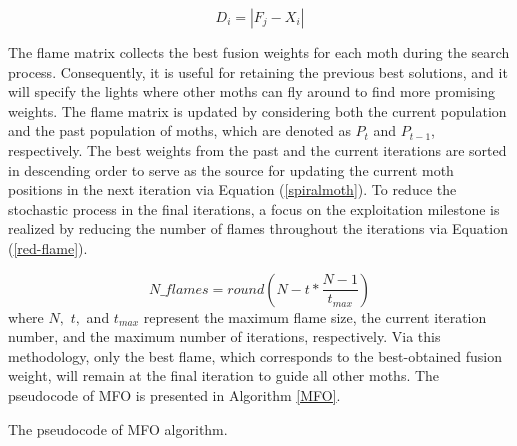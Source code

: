 \begin{equation}\label{distancemoth}
	{D_i}= |F_j - X_i|
\end{equation}


The flame matrix collects the best fusion weights for each moth during the search process. Consequently, it is useful for retaining the previous best solutions, and it will specify the lights where other moths can fly around to find more promising weights. The flame matrix is updated by considering both the current population and the past population of moths, which are denoted as $P_t$ and $P_{t-1}$, respectively. The best weights from the past and the current iterations are sorted in descending order to serve as the source for updating the current moth positions in the next iteration via Equation (\ref{spiralmoth}). To reduce the stochastic process in the final iterations, a focus on the exploitation milestone is realized by reducing the number of flames throughout the iterations via Equation (\ref{red-flame}).

\begin{equation}\label{red-flame}
	N{\_}{flames}= round\left(N-t *\frac{N-1}{t_{max}} \right)
\end{equation}
where $N,$ $t,$ and $t_{max}$ represent the maximum flame size, the current iteration number, and the maximum number of iterations, respectively. Via this methodology, only the best flame, which corresponds to the best-obtained fusion weight, will remain at the final iteration to guide all other moths. The pseudocode of MFO is presented in Algorithm \ref{MFO}.

\begin{algorithm}
	\caption{The pseudocode of MFO algorithm. \label{MFO}}

\end{algorithm}


